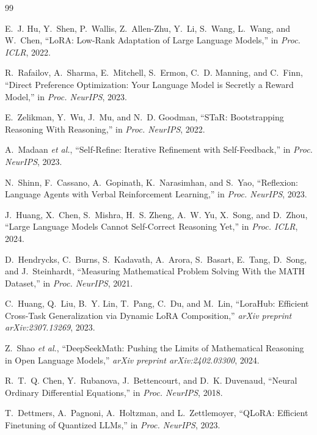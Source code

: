 \documentclass[11pt,a4paper]{article}
\begin{document}
\begin{thebibliography}{99}

E.~J. Hu, Y.~Shen, P.~Wallis, Z.~Allen-Zhu, Y.~Li, S.~Wang, L.~Wang, and W.~Chen, ``LoRA: Low-Rank Adaptation of Large Language Models,'' in \textit{Proc. ICLR}, 2022.

R.~Rafailov, A.~Sharma, E.~Mitchell, S.~Ermon, C.~D. Manning, and C.~Finn, ``Direct Preference Optimization: Your Language Model is Secretly a Reward Model,'' in \textit{Proc. NeurIPS}, 2023.

E.~Zelikman, Y.~Wu, J.~Mu, and N.~D. Goodman, ``STaR: Bootstrapping Reasoning With Reasoning,'' in \textit{Proc. NeurIPS}, 2022.

A.~Madaan \textit{et al.}, ``Self-Refine: Iterative Refinement with Self-Feedback,'' in \textit{Proc. NeurIPS}, 2023.

N.~Shinn, F.~Cassano, A.~Gopinath, K.~Narasimhan, and S.~Yao, ``Reflexion: Language Agents with Verbal Reinforcement Learning,'' in \textit{Proc. NeurIPS}, 2023.

J.~Huang, X.~Chen, S.~Mishra, H.~S. Zheng, A.~W. Yu, X.~Song, and D.~Zhou, ``Large Language Models Cannot Self-Correct Reasoning Yet,'' in \textit{Proc. ICLR}, 2024.

D.~Hendrycks, C.~Burns, S.~Kadavath, A.~Arora, S.~Basart, E.~Tang, D.~Song, and J.~Steinhardt, ``Measuring Mathematical Problem Solving With the MATH Dataset,'' in \textit{Proc. NeurIPS}, 2021.

C.~Huang, Q.~Liu, B.~Y. Lin, T.~Pang, C.~Du, and M.~Lin, ``LoraHub: Efficient Cross-Task Generalization via Dynamic LoRA Composition,'' \textit{arXiv preprint arXiv:2307.13269}, 2023.

Z.~Shao \textit{et al.}, ``DeepSeekMath: Pushing the Limits of Mathematical Reasoning in Open Language Models,'' \textit{arXiv preprint arXiv:2402.03300}, 2024.

R.~T.~Q. Chen, Y.~Rubanova, J.~Bettencourt, and D.~K. Duvenaud, ``Neural Ordinary Differential Equations,'' in \textit{Proc. NeurIPS}, 2018.

T.~Dettmers, A.~Pagnoni, A.~Holtzman, and L.~Zettlemoyer, ``QLoRA: Efficient Finetuning of Quantized LLMs,'' in \textit{Proc. NeurIPS}, 2023.


\end{thebibliography}
\end{document}
